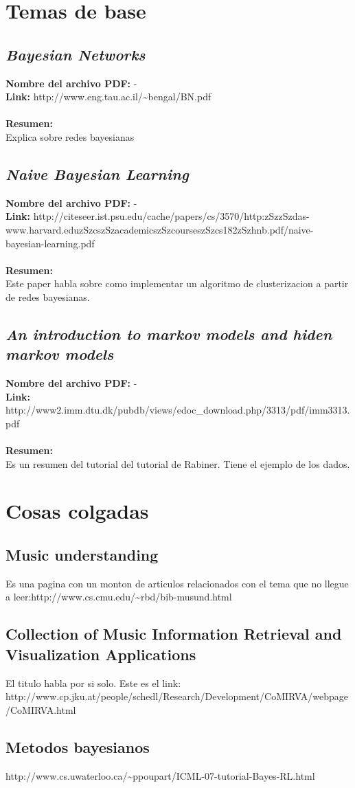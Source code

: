 \documentclass[a4paper,10pt]{article}
\newcommand{\titulo}[1]{\def\Titulo{#1}}
\newcommand{\resumen}[1]{\def\Resumen{#1}}
\newcommand{\link}[1]{\def\Link{#1}}
\newenvironment{resumenpaper}{
\let\Titulo\empty
\let\Resumen\empty
\let\Archivo-
\let\Link-
\let\Id\empty
}{
\subsection{\textit{\Titulo}}
\label{\Id}
\noindent \textbf{Nombre del archivo PDF: }{\Archivo}\\
\noindent \textbf{Link: }{\Link}\\ \\
\noindent \textbf{Resumen:} \\ {\Resumen}
}
\begin{document}
\section{Temas de base}
\begin{resumenpaper}
 \titulo{Bayesian Networks}
 \link{http://www.eng.tau.ac.il/\~{}bengal/BN.pdf}
 \resumen{Explica sobre redes bayesianas}
\end{resumenpaper}

\begin{resumenpaper}
 \titulo{Naive Bayesian Learning}
 \link{http://citeseer.ist.psu.edu/cache/papers/cs/3570/http:zSzzSzdas-www.harvard.eduzSzcszSzacademicszSzcourseszSzcs182zSzhnb.pdf/naive-bayesian-learning.pdf}
 \resumen{Este paper habla sobre como implementar un algoritmo de clusterizacion a partir de redes bayesianas.}
\end{resumenpaper}

\begin{resumenpaper}
 \titulo{An introduction to markov models and hiden markov models}
 \link{http://www2.imm.dtu.dk/pubdb/views/edoc\_download.php/3313/pdf/imm3313.pdf}
 \resumen{Es un resumen del tutorial del tutorial de Rabiner. Tiene el ejemplo de los dados.}
\end{resumenpaper}


\section{Cosas colgadas}
\subsection{Music understanding}
Es una pagina con un monton de articulos relacionados con el tema que no llegue a leer:http://www.cs.cmu.edu/\~{}rbd/bib-musund.html

\subsection{Collection of Music Information Retrieval and Visualization Applications}
El titulo habla por si solo. Este es el link: \newline http://www.cp.jku.at/people/schedl/Research/Development/CoMIRVA/webpage/CoMIRVA.html

\subsection{Metodos bayesianos}
http://www.cs.uwaterloo.ca/\~{}ppoupart/ICML-07-tutorial-Bayes-RL.html
\end{document}
